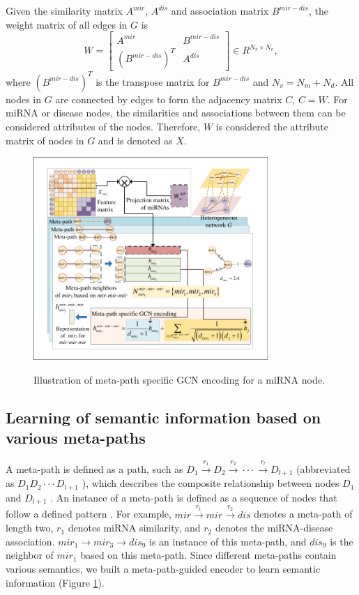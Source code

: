 \documentclass[journal,twoside,web]{ieeecolor}
\begin{document}
Given the similarity matrix ${A^{mir}}$, ${A^{dis}}$ and association matrix ${B^{mir - dis}}$, the weight matrix of all edges in $G$ is
\begin{equation}
W = \left[ {\begin{array}{*{20}{c}}
{{A^{mir}}}&{{B^{mir - dis}}}\\
{{{\left( {{B^{mir - dis}}} \right)}^T}}&{{A^{dis}}}
\end{array}} \right] \in {R^{{N_v} \times {N_v}}},
\end{equation}
 where ${\left( {{B^{mir - dis}}} \right)^T}$ is the transpose matrix for ${B^{mir - dis}}$ and ${N_v} = {N_m} + {N_d}$. All nodes in $G$ are connected by edges to form the adjacency matrix $C$, $C = W$. For miRNA or disease nodes, the similarities and associations between them can be considered attributes of the nodes. Therefore, $W$ is considered the attribute matrix of nodes in $G$ and is denoted as $X$.
\begin{figure}[!t]
	\centering
	\includegraphics[width=3.5in]{fig/fig-2.pdf}\\
	\caption{ Illustration of meta-path specific GCN encoding for a miRNA node.}
	\label{fig:02}
	\vspace{-0.4cm}
\end{figure}

\subsection{Learning of semantic information based on various meta-paths}

A meta-path is defined as a path, such as ${D_1}\xrightarrow{{{r_1}}}{D_2}\xrightarrow{{{r_2}}}\cdot  \cdot  \cdot \xrightarrow{{{r_l}}}{D_{l + 1}}$ (abbreviated as ${D_1}{D_2} \cdot  \cdot  \cdot {D_{l + 1}}$ ), which describes the composite relationship between nodes ${D_1}$ and ${D_{l + 1}}$ \cite{37}. An instance of a meta-path is defined as a sequence of nodes that follow a defined pattern \cite{37}. For example, $mir\xrightarrow{{{r_1}}}mir\xrightarrow{{{r_2}}}dis$ denotes a meta-path of length two, ${r_1}$ denotes miRNA similarity, and ${r_2}$ denotes the miRNA-disease association. $mi{r_1} \to mi{r_3} \to di{s_9}$ is an instance of this meta-path, and $di{s_9}$ is the neighbor of $mi{r_1}$ based on this meta-path. Since different meta-paths contain various semantics, we built a meta-path-guided encoder to learn semantic information (Figure \ref{fig:02}).
\end{document}

